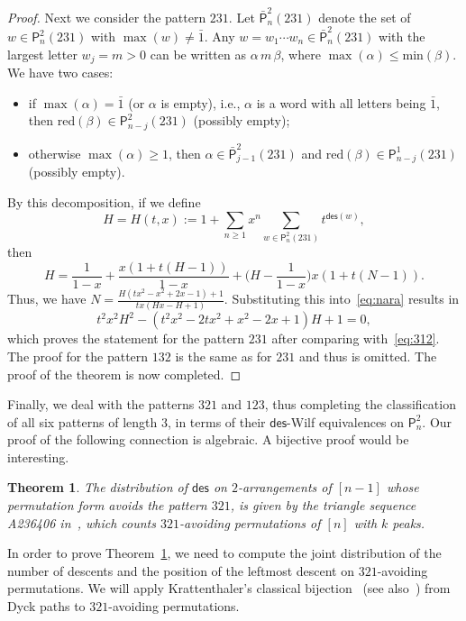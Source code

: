 \documentclass[12pt]{amsart} %
\numberwithin{equation}{section}
\theoremstyle{plain}
\newtheorem{theorem}{Theorem}[section]
\theoremstyle{definition}
\renewcommand\P{\mathsf{P}}
\def\reduction{\mathrm{red}}
\def\max{\mathrm{max}}
\def\min{\mathrm{min}}
\def\des{\mathsf{des}}
\def\max{\operatorname{max}}
\def\neg#1{{{{\bar#1}}}}
\begin{document}
\begin{proof}
Next we consider the pattern $231$. Let $\bar{\P}_n^2(231)$ denote the set of $w\in\P_n^2(231)$ with $\max(w)\neq\neg1$. Any $w=w_1\cdots w_n\in\bar{\P}_n^2(231)$ with the largest letter $w_j=m>0$ can be written as $\alpha\,m\,\beta$, where $\max(\alpha)\leq \min(\beta)$. We have two cases:
\begin{itemize}
\item if $\max(\alpha)=\neg1$ (or $\alpha$ is empty), i.e., $\alpha$ is a word with all letters being $\neg1$, then $\reduction(\beta)\in\P_{n-j}^2(231)$ (possibly empty);
\item otherwise $\max(\alpha)\ge 1$, then $\alpha\in\bar{\P}_{j-1}^2(231)$ and $\reduction(\beta)\in\P_{n-j}^1(231)$ (possibly empty). 
\end{itemize}
By this decomposition, if we define 
$$
H=H(t,x):=1+\sum_{n\geq1}x^n\sum_{w\in\P_n^2(231)}t^{\des(w)},
$$
then 
$$
H=\frac{1}{1-x}+\frac{x(1+t(H-1))}{1-x}+\biggl(H-\frac{1}{1-x}\biggr)x(1+t(N-1)). 
$$
Thus, we have
$N=\frac{H(tx^2-x^2+2x-1)+1}{tx(Hx-H+1)}$. Substituting this into~\eqref{eq:nara} results in
$$
t^2x^2H^2-(t^2x^2-2tx^2+x^2-2x+1)H+1=0,
$$
which proves the statement for the pattern $231$ after comparing with~\eqref{eq:312}. The proof for the pattern $132$ is the same as for $231$ and thus is omitted. The proof of the theorem is now completed. 
\end{proof}

Finally, we deal with the patterns $321$ and $123$, thus completing the classification of all six patterns of length $3$, in terms of their $\des$-Wilf equivalences on $\P_n^2$. Our proof of the following connection is algebraic. A bijective proof would be interesting. 

\begin{theorem}\label{thm:321}
The distribution of $\des$ on $2$-arrangements of $[n-1]$ whose permutation form avoids the pattern $321$, is given by the triangle sequence A236406 in~\cite{oeis}, which counts $321$-avoiding permutations of $[n]$ with $k$ peaks.
\end{theorem}

In order to prove Theorem~\ref{thm:321}, we need to compute the joint distribution of the number of descents and the position of the leftmost descent on $321$-avoiding permutations. We will apply Krattenthaler's classical bijection~\cite{kr} (see also~\cite{eli}) from Dyck paths to $321$-avoiding permutations. 
   
\end{document}
